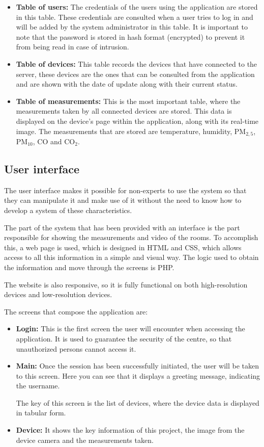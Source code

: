 \begin{itemize}
	\item \textbf{Table of users:} The credentials of the users using the application are stored in this table. These credentials are consulted when a user tries to log in and will be added by the system administrator in this table. It is important to note that the password is stored in hash format (encrypted) to prevent it from being read in case of intrusion.
	\item \textbf{Table of devices:} This table records the devices that have connected to the server, these devices are the ones that can be consulted from the application and are shown with the date of update along with their current status.
	\item \textbf{Table of measurements:} This is the most important table, where the measurements taken by all connected devices are stored. This data is displayed on the device's page within the application, along with its real-time image. The measurements that are stored are temperature, humidity, PM$_{2,5}$, PM$_{10}$, CO and CO$_2$.
\end{itemize}

\subsection{User interface}\label{subsec:user-interface}
The user interface makes it possible for non-experts to use the system so that they can manipulate it and make use of it without the need to know how to develop a system of these characteristics.

The part of the system that has been provided with an interface is the part responsible for showing the measurements and video of the rooms. To accomplish this, a web page is used, which is designed in HTML and CSS, which allows access to all this information in a simple and visual way. The logic used to obtain the information and move through the screens is PHP\@.

The website is also responsive, so it is fully functional on both high-resolution devices and low-resolution devices.

The screens that compose the application are:
\begin{itemize}
	\item \textbf{Login:} This is the first screen the user will encounter when accessing the application. It is used to guarantee the security of the centre, so that unauthorized persons cannot access it.
	\item \textbf{Main:} Once the session has been successfully initiated, the user will be taken to this screen. Here you can see that it displays a greeting message, indicating the username.

	The key of this screen is the list of devices, where the device data is displayed in tabular form.
	\item \textbf{Device:} It shows the key information of this project, the image from the device camera and the measurements taken.
\end{itemize}

